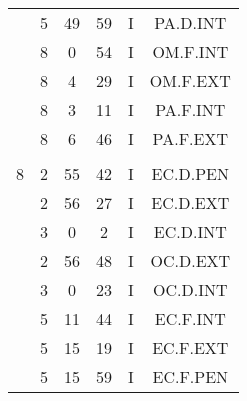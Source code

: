 \documentclass[12pt, a4paper]{article}
\begin{document}
\begin{multicols}{3}
{\begin{tabular}{c c c c c c}
	 	 	 	 & 5 & 49 & 59 & I & PA.D.INT\\%
	 	 	 	 & 8 & 0 & 54 & I & OM.F.INT\\%
	 	 	 	 & 8 & 4 & 29 & I & OM.F.EXT\\%
	 	 	 	 & 8 & 3 & 11 & I & PA.F.INT\\%
	 	 	 	 & 8 & 6 & 46 & I & PA.F.EXT\\%
	 	 	 	 & & & & & \\%
	 	 	 	8 & 2 & 55 & 42 & I & EC.D.PEN\\%
	 	 	 	 & 2 & 56 & 27 & I & EC.D.EXT\\%
	 	 	 	 & 3 & 0 & 2 & I & EC.D.INT\\%
	 	 	 	 & 2 & 56 & 48 & I & OC.D.EXT\\%
	 	 	 	 & 3 & 0 & 23 & I & OC.D.INT\\%
	 	 	 	 & 5 & 11 & 44 & I & EC.F.INT\\%
	 	 	 	 & 5 & 15 & 19 & I & EC.F.EXT\\%
	 	 	 	 & 5 & 15 & 59 & I & EC.F.PEN\\%
	 	 \end{tabular}
 	}
\end{multicols}
\end{document}
